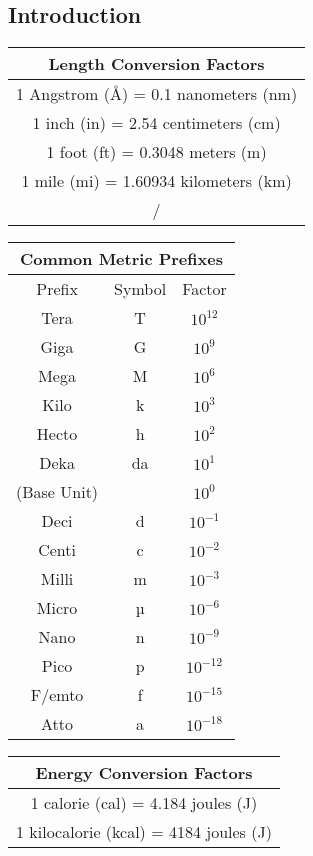 \documentclass[10pt, roman]{article}
\begin{document}
\subsection{Introduction}
\begin{minipage}{0.48\textwidth}
\centering
\begin{tabular}{|c|}
\hline
\textbf{Length Conversion Factors} \\
\hline
1 Angstrom (Å) = 0.1 nanometers (nm) \\
1 inch (in) = 2.54 centimeters (cm) \\
1 foot (ft) = 0.3048 meters (m) \\
1 mile (mi) = 1.60934 kilometers (km) \\
\hline/
\end{tabular}

\vspace{20pt}

\begin{tabular}{|c|c|c|}
\hline
\multicolumn{3}{|c|}{\textbf{Common Metric Prefixes}} \\
\hline
Prefix & Symbol & Factor \\
\hline
Tera & T & $10^{12}$ \\
Giga & G & $10^{9}$ \\
Mega & M & $10^{6}$ \\
Kilo & k & $10^{3}$ \\
Hecto & h & $10^{2}$ \\
Deka & da & $10^{1}$ \\
\hline
(Base Unit) &  & $10^{0}$ \\
\hline
Deci & d & $10^{-1}$ \\
Centi & c & $10^{-2}$ \\
Milli & m & $10^{-3}$ \\
Micro & µ & $10^{-6}$ \\
Nano & n & $10^{-9}$ \\
Pico & p & $10^{-12}$ \\
F/emto & f & $10^{-15}$ \\
Atto & a & $10^{-18}$ \\
\hline
\end{tabular}

\vspace{20pt}

\begin{tabular}{|c|}
\hline
\textbf{Energy Conversion Factors} \\
\hline
1 calorie (cal) = 4.184 joules (J) \\
1 kilocalorie (kcal) = 4184 joules (J) \\
\hline
\end{tabular}
\end{minipage}
\end{document}

